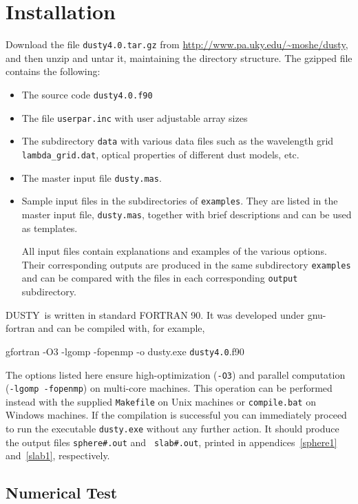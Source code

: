 \documentclass[11pt]{article}
\def\ver  {{\tt dusty4.0}}
\def\D    {{\sf DUSTY}}
\begin{document}
\section{Installation}
\label{sec:installation}

Download the file {\tt \ver.tar.gz} from
\url{http://www.pa.uky.edu/~moshe/dusty}, and then unzip and untar it,
maintaining the directory structure. The gzipped file contains the
following:
%
\begin{itemize}
%
\item The source code {\tt \ver.f90}
%
\item The file {\tt userpar.inc} with user adjustable array sizes
%
\item The subdirectory {\tt data} with various data files such as the
  wavelength grid {\tt lambda\_grid.dat}, optical properties of
  different dust models, etc.
%
\item The master input file {\tt dusty.mas}.
%
\item Sample input files in the subdirectories of {\tt examples}. They
  are listed in the master input file, {\tt dusty.mas}, together with
  brief descriptions and can be used as templates.
%

  All input files contain explanations and examples of the various
  options.  Their corresponding outputs are produced in the same
  subdirectory {\tt examples} and can be compared with the files in
  each corresponding {\tt output} subdirectory.
\end{itemize}

\D\ is written in standard FORTRAN 90. It was developed under
gnu-fortran and can be compiled with, for example,

\bigskip

{\tt

  gfortran -O3 -lgomp -fopenmp -o dusty.exe \ver.f90 }

\bigskip\noindent The options listed here ensure high-optimization
({\tt -O3}) and parallel computation ({\tt -lgomp -fopenmp}) on
multi-core machines. This operation can be performed instead with the
supplied {\tt Makefile} on Unix machines or {\tt compile.bat} on
Windows machines. If the compilation is successful you can immediately
proceed to run the executable {\tt dusty.exe} without any further
action. It should produce the output files {\tt sphere\#.out} and {\tt
  slab\#.out}, printed in appendices~\ref{sphere1} and~\ref{slab1},
respectively.

\subsection{Numerical Test}
\end{document}
